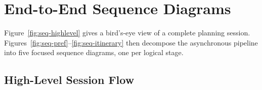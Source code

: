 \documentclass[12pt,a4paper]{report}
\begin{document}
\section{End-to-End Sequence Diagrams}
 
Figure~\ref{fig:seq-highlevel} gives a bird's-eye view of a complete planning session.
Figures~\ref{fig:seq-pref}--\ref{fig:seq-itinerary} then decompose the asynchronous pipeline
into five focused sequence diagrams, one per logical stage.
 
\subsection{High-Level Session Flow}
 
\end{document}
